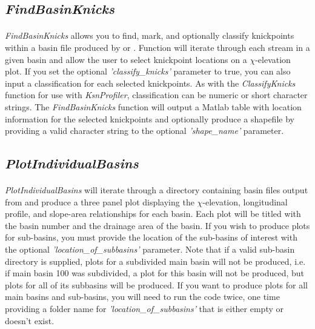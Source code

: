 \subsection{\textit{FindBasinKnicks}} \label{sec:BsnKncks}
\paragraph{}\textit{FindBasinKnicks} allows you to find, mark, and optionally classify knickpoints within a basin file produced by  or . Function will iterate through each stream in a given basin and allow the user to select knickpoint locations on a $\chi$-elevation plot. If you set the optional \textit{'classify\_knicks'} parameter to true, you can also input a classification for each selected knickpoints. As with the \textit{ClassifyKnicks} function for use with \textit{KsnProfiler}, classification can be numeric or short character strings. The \textit{FindBasinKnicks} function will output a Matlab table with location information for the selected knickpoints and optionally produce a shapefile by providing a valid character string to the optional \textit{'shape\_name'} parameter.

\subsection{\textit{PlotIndividualBasins}}
\paragraph{}\textit{PlotIndividualBasins} will iterate through a directory containing basin files output from  and produce a three panel plot displaying the $\chi$-elevation, longitudinal profile, and slope-area relationships for each basin. Each plot will be titled with the basin number and the drainage area of the basin. If you wish to produce plots for sub-basins, you must provide the location of the sub-basins of interest with the optional \textit{'location\_of\_subbasins'} parameter. Note that if a valid sub-basin directory is supplied, plots for a subdivided main basin will not be produced, i.e. if main basin 100 was subdivided, a plot for this basin will not be produced, but plots for all of its subbasins will be produced. If you want to produce plots for all main basins and sub-basins, you will need to run the code twice, one time providing a folder name for \textit{'location\_of\_subbasins'}  that is either empty or doesn't exist.

